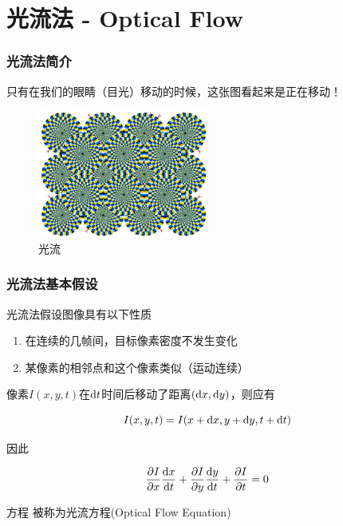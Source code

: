 \section{光流法 - Optical Flow}


\begin{frame}
    \frametitle{光流法简介}

    只有在我们的眼睛（目光）移动的时候，这张图看起来是正在移动！

    \begin{figure}
        \centering
        \includegraphics[width=0.5\textwidth]{images/optical_flow_human.jpg}
        \caption{光流}
    \end{figure}

\end{frame}


\begin{frame}
    \frametitle{光流法基本假设}

    光流法假设图像具有以下性质

    \begin{enumerate}
        \item 在连续的几帧间，目标像素密度不发生变化
        \item 某像素的相邻点和这个像素类似（运动连续）
    \end{enumerate}

    像素$I(x, y, t)$在$\mathrm{d} t$时间后移动了距离$(\mathrm{d} x, \mathrm{d} y)$，则应有


    \begin{equation}
        I(x, y, t) = I(x + \mathrm{d} x, y + \mathrm{d} y, t + \mathrm{d} t)
    \end{equation}

    因此

    \begin{equation}
        \label{eq:optical_flow_eq}
        \frac{\partial I}{\partial x} \frac{\mathrm{d} x}{\mathrm{d} t} + \frac{\partial I}{\partial y} \frac{\mathrm{d} y}{\mathrm{d} t} + \frac{\partial I}{\partial t} = 0
    \end{equation}

    方程  被称为光流方程(Optical Flow Equation)

\end{frame}


